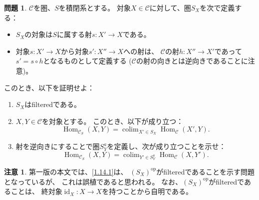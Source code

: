 \documentclass[uplatex,dvipdfmx]{jsarticle}
\theoremstyle{definition}
\newtheorem{prob}[prob]{問題}
\newtheorem*{rem*}{注意}
\DeclareMathOperator{\Hom}{\mathrm{Hom}}
\DeclareMathOperator{\id}{\mathrm{id}}
\newcommand{\op}{\mathrm{op}}
\DeclareMathOperator{\colim}{\mathrm{colim}}
\newcommand\mcC{\mathcal{C}}
\begin{document}
\begin{prob}\label{1.14}
  \(\mcC\)を圏、\(S\)を積閉系とする。
  対象\(X\in \mcC\)に対して、圏\(S_X\)を次で定義する：
  \begin{itemize}
    \item
    \(S_X\)の対象は\(S\)に属する射\(s:X'\to X\)である。
    \item
    対象\(s:X'\to X\)から対象\(s':X''\to X\)への射は、
    \(\mcC\)の射\(h:X''\to X'\)であって
    \(s'=s\circ h\)となるものとして定義する
    (\(\mcC\)の射の向きとは逆向きであることに注意)。
  \end{itemize}
  このとき、以下を証明せよ：
  \begin{enumerate}
    \item \label{1.14.1}
    \(S_X\)はfilteredである。
    \item \label{1.14.2}
    \(X,Y\in \mcC\)を対象とする。
    このとき、以下が成り立つ：
    \[\Hom_{\mcC_S}(X,Y) = \colim_{X'\in S_X}\Hom_{\mcC}(X',Y).\]
    \item \label{1.14.3}
    射を逆向きにすることで圏\(S_Y^a\)を定義し、次が成り立つことを示せ：
    \[\Hom_{\mcC_S}(X,Y) = \colim_{Y'\in S_Y^a}\Hom_{\mcC}(X,Y').\]
  \end{enumerate}
\end{prob}

\begin{rem*}
  第一版の本文では、\ref{1.14.1}は、
  \((S_X)^{\op}\)がfilteredであることを示す問題となっているが、
  これは誤植であると思われる。
  なお、\((S_X)^{\op}\)がfilteredであることは、
  終対象\(\id_X:X\to X\)を持つことから自明である。
\end{rem*}
\end{document}
